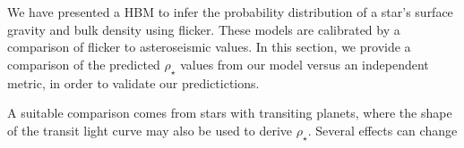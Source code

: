 
We have presented a HBM to infer the probability distribution of a star's
surface gravity and bulk density using flicker. These models are calibrated by a 
comparison of flicker to asteroseismic values. In this section, we provide a
comparison of the predicted $\rho_{\star}$ values from our model versus an
independent metric, in order to validate our predictictions.

A suitable comparison comes from stars with transiting planets, where the shape 
of the transit light curve may also be used to derive $\rho_{\star}$. Several
effects can change 
